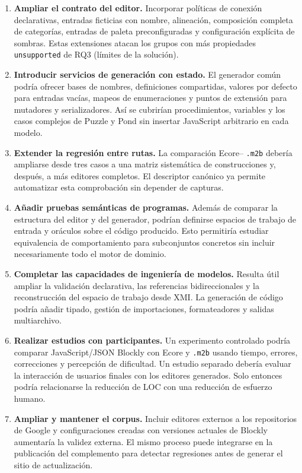 \begin{enumerate}
  \item \textbf{Ampliar el contrato del editor.} Incorporar políticas de
  conexión declarativas, entradas ficticias con nombre, alineación, composición
  completa de categorías, entradas de paleta preconfiguradas y configuración
  explícita de sombras. Estas extensiones atacan los grupos con más propiedades
  \texttt{unsupported} de RQ3 (límites de la solución).

  \item \textbf{Introducir servicios de generación con estado.} El generador
  común podría ofrecer bases de nombres, definiciones compartidas, valores por
  defecto para entradas vacías, mapeos de enumeraciones y puntos de extensión
  para mutadores y serializadores. Así se cubrirían procedimientos, variables y
  los casos complejos de Puzzle y Pond sin insertar JavaScript arbitrario en
  cada modelo.

  \item \textbf{Extender la regresión entre rutas.} La comparación Ecore--
  \texttt{.m2b} debería ampliarse desde tres casos a una matriz sistemática de
  construcciones y, después, a más editores completos. El descriptor canónico
  ya permite automatizar esta comprobación sin depender de capturas.

  \item \textbf{Añadir pruebas semánticas de programas.} Además de comparar la
  estructura del editor y del generador, podrían definirse espacios de trabajo de entrada
  y oráculos sobre el código producido. Esto permitiría estudiar equivalencia
  de comportamiento para subconjuntos concretos sin incluir necesariamente todo
  el motor de dominio.

  \item \textbf{Completar las capacidades de ingeniería de modelos.} Resulta
  útil ampliar la validación declarativa, las referencias bidireccionales y la
  reconstrucción del espacio de trabajo desde XMI. La generación de código podría añadir
  tipado, gestión de importaciones, formateadores y salidas multiarchivo.

  \item \textbf{Realizar estudios con participantes.} Un experimento controlado
  podría comparar JavaScript/JSON Blockly con Ecore y \texttt{.m2b} usando
  tiempo, errores, correcciones y percepción de dificultad. Un estudio separado
  debería evaluar la interacción de usuarios finales con los editores
  generados. Solo entonces podría relacionarse la reducción de LOC con una
  reducción de esfuerzo humano.

  \item \textbf{Ampliar y mantener el corpus.} Incluir editores externos a los
  repositorios de Google y configuraciones creadas con versiones actuales de
  Blockly aumentaría la validez externa. El mismo proceso puede integrarse en la
  publicación del complemento para detectar regresiones antes de generar el sitio de
  actualización.
\end{enumerate}

